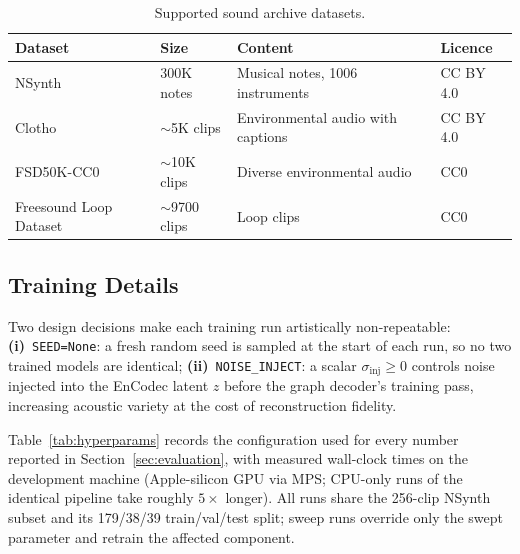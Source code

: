 \documentclass[12pt,a4paper]{article}
\begin{document}
\begin{table}[h]
\centering
\caption{Supported sound archive datasets.}
\begin{tabular}{llll}
\toprule
Dataset & Size & Content & Licence \\
\midrule
NSynth~\cite{nsynth} & 300K notes & Musical notes, 1006 instruments & CC BY 4.0 \\
Clotho~\cite{clotho} & $\sim$5K clips & Environmental audio with captions & CC BY 4.0 \\
FSD50K-CC0 & $\sim$10K clips & Diverse environmental audio & CC0 \\
Freesound Loop Dataset & $\sim$9700 clips & Loop clips & CC0 \\
\bottomrule
\end{tabular}
\label{tab:datasets}
\end{table}

\subsection{Training Details}
\label{subsec:impl_training}

Two design decisions make each training run artistically non-repeatable:
\textbf{(i)}~\texttt{SEED=None}: a fresh random seed is sampled at the
start of each run, so no two trained models are identical;
\textbf{(ii)}~\texttt{NOISE\_INJECT}: a scalar $\sigma_{\mathrm{inj}} \geq 0$
controls noise injected into the EnCodec latent $z$ before the graph
decoder's training pass, increasing acoustic variety at the cost of
reconstruction fidelity.

Table~\ref{tab:hyperparams} records the configuration used for every
number reported in Section~\ref{sec:evaluation}, with measured wall-clock
times on the development machine (Apple-silicon GPU via MPS; CPU-only
runs of the identical pipeline take roughly $5\times$ longer). All runs
share the 256-clip NSynth subset and its 179/38/39 train/val/test
split; sweep runs override only the swept parameter and retrain the
affected component.
\end{document}
